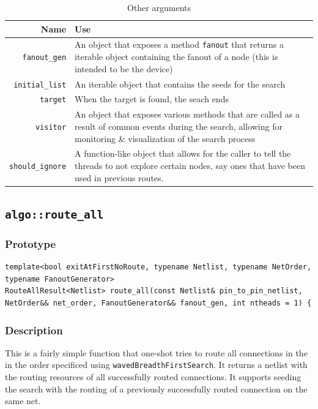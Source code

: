 \documentclass[11pt]{article}
\begin{document}
\begin{table}[H]
\centering
\begin{tabular}{r | p{12cm}}
\hline\hline
Name & Use \\
\hline
\texttt{fanout_gen}    & An object that exposes a method \texttt{fanout} that returns a iterable object containing the fanout of a node (this is intended to be the device) \\
\texttt{initial_list}  & An iterable object that contains the seeds for the search \\
\texttt{target}        & When the target is found, the seach ends \\
\texttt{visitor}       & An object that exposes various methods that are called as a result of common events during the search, allowing for monitoring \& visualization of the search process \\
\texttt{should_ignore} & A function-like object that allows for the caller to tell the threads to not explore certain nodes, say ones that have been used in previous routes. \\
\hline\hline
\end{tabular}
\caption{Other arguments}\label{tab:wbfs-args}
\end{table}

\subsection{\texttt{algo::route_all}}
\subsubsection{Prototype}
\begin{lstlisting}
template<bool exitAtFirstNoRoute, typename Netlist, typename NetOrder, typename FanoutGenerator>
RouteAllResult<Netlist> route_all(const Netlist& pin_to_pin_netlist, NetOrder&& net_order, FanoutGenerator&& fanout_gen, int ntheads = 1) {
\end{lstlisting}

\subsubsection{Description}
This is a fairly simple function that one-shot tries to route all connections in the in the order specificed using \texttt{wavedBreadthFirstSearch}. It returns a netlist with the routing resources of all successfully routed connections. It supports seeding the search with the routing of a previously successfully routed connection on the same net.
\end{document}

